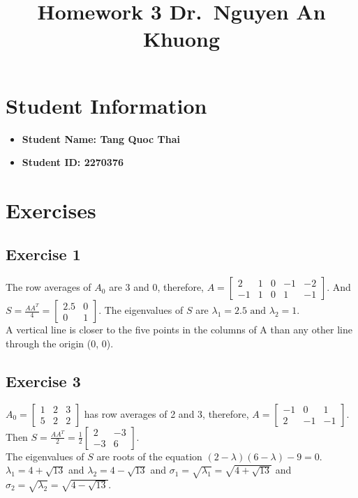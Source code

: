 \documentclass{article}
\author{}
\begin{document}
\title{Homework 3 \- Dr.\ Nguyen An Khuong}
\maketitle
\section{Student Information}
\begin{itemize}
    \item \bf{Student Name:} Tang Quoc Thai
    \item \bf{Student ID:} 2270376
\end{itemize}

\section{Exercises}
\subsection{Exercise 1}
The row averages of $A_{0}$ are 3 and 0, therefore, $A = \begin{bmatrix} 2 & 1 & 0 & -1 & -2 \\ -1 & 1 & 0 & 1 & -1 \end{bmatrix}$.
And $S = \frac{AA^{T}}{4} = \begin{bmatrix}
    2.5 & 0 \\
    0 & 1
\end{bmatrix}$.
The eigenvalues of $S$ are $\lambda_{1} = 2.5 \text{ and } \lambda_{2} = 1$.
\\
A vertical line is closer to the five points in the columns of A than any other line through the origin (0, 0).


\subsection{Exercise 3}
$A_{0} = \begin{bmatrix}
    1 & 2 & 3 \\
    5 & 2 & 2
\end{bmatrix}$ has row averages of 2 and 3, therefore, $A = \begin{bmatrix}
    -1 & 0 & 1 \\
    2 & -1 & -1
\end{bmatrix}$.
Then $S = \frac{AA^{T}}{2} = \frac{1}{2} \begin{bmatrix}
    2 & -3 \\
    -3 & 6
\end{bmatrix}$.\\
The eigenvalues of $S$ are roots of the equation $(2 - \lambda)(6 - \lambda) - 9 = 0$. $\lambda_{1} = 4 + \sqrt{13}$ and $\lambda_{2} = 4 - \sqrt{13}$ and $\sigma_{1} = \sqrt{\lambda_{1}} = \sqrt{4 + \sqrt{13}}$ and $\sigma_{2} = \sqrt{\lambda_{2}} = \sqrt{4 - \sqrt{13}}$.
\end{document}
